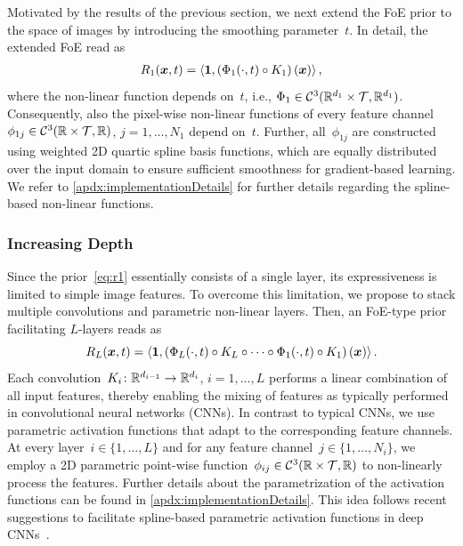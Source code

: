\documentclass[nohyperref]{article}
\newcommand{\C}{\mathcal{C}}
\newcommand{\T}{\mathcal{T}}
\newcommand{\scal}[2]{\left\langle#1,#2\right\rangle}
\renewcommand{\vec}[1]{\mathbf{#1}}
\theoremstyle{plain}
\theoremstyle{definition}
\theoremstyle{remark}
\begin{document}
Motivated by the results of the previous section, we next extend the FoE prior to the space of images by introducing the smoothing parameter~$t$.
In detail, the extended FoE read as
\begin{align}\label{eq:r1}
R_1(\vx,t) = \scal{\vec{1}}{\left(\Phi_1(\cdot, t) \circ K_1\right)(\vx)},
\end{align}
where the non-linear function depends on~$t$, i.e., $\Phi_1\in\C^3(\R^{d_1}\times\T,\R^{d_1})$.
Consequently, also the pixel-wise non-linear functions of every feature channel~$\phi_{1j}\in\C^3(\R\times\T,\R)$, $j=1,\ldots,N_1$ depend on~$t$. 
Further, all~$\phi_{1j}$ are constructed using weighted 2D quartic spline basis functions, which are equally distributed over the input domain to ensure sufficient smoothness for gradient-based learning.
We refer to \cref{apdx:implementationDetails} for further details regarding the spline-based non-linear functions.

\subsubsection{Increasing Depth}
Since the prior~\eqref{eq:r1} essentially consists of a single layer, its expressiveness is limited to simple image features.
To overcome this limitation, we propose to stack multiple convolutions and parametric non-linear layers.
Then, an FoE-type prior facilitating $L$-layers reads as
\[
R_L(\vx,t) = \scal{\vec{1}}{\left(\Phi_L(\cdot,t)\circ K_L\circ\cdots\circ\Phi_1(\cdot, t) \circ K_1\right)(\vx)}.
\]
Each convolution~$K_i\colon\mathbb{R}^{d_{i-1}}\to\mathbb{R}^{d_i}$, $i=1,\ldots,L$ performs a linear combination of all input features, thereby enabling the mixing of features as typically performed in convolutional neural networks (CNNs).
In contrast to typical CNNs, we use parametric activation functions that adapt to the corresponding feature channels.
At every layer~$i\in\{1,\ldots,L\}$ and for any feature channel~$j\in\{1,\ldots,N_i\}$, we employ a 2D parametric point-wise function~$\phi_{ij}\in\C^3(\R\times\T,\R)$ to non-linearly process the features.
Further details about the parametrization of the activation functions can be found in \cref{apdx:implementationDetails}.
This idea follows recent suggestions to facilitate spline-based parametric activation functions in deep CNNs~\citep{OcMe18,AzGu20}.
\end{document}
